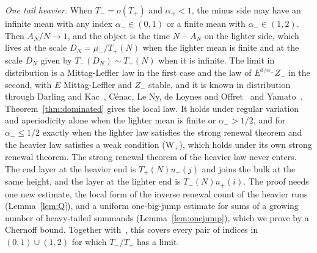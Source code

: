 \emph{One tail heavier.} When $T_\minus=o(T_\plus)$ and $\alpha_\plus<1$, the minus side may have
an infinite mean with any index $\alpha_\minus\in(0,1)$ or a finite mean with
$\alpha_\minus\in(1,2)$. Then $A_N/N\to1$, and the object is the time $N-A_N$ on the lighter
side, which lives at the scale $D_N=\mu_\minus/T_\plus(N)$ when the lighter mean is finite and at
the scale $D_N$ given by $T_\minus(D_N)\sim T_\plus(N)$ when it is infinite. The limit in
distribution is a Mittag-Leffler law in the first case and the law of $E^{1/\alpha_\minus}Z_\minus$
in the second, with $E$ Mittag-Leffler and $Z_\minus$ stable, and it is known in distribution
through Darling and Kac~\cite{darlingkac1957}, C\'enac, Le Ny, de Loynes and
Offret~\cite[Section~4.3]{clnlo2019} and Yamato~\cite{yamato2026}. Theorem~\ref{thm:dominated}
gives the local law. It holds under regular variation and aperiodicity alone when the lighter
mean is finite or $\alpha_\minus>1/2$, and for $\alpha_\minus\le1/2$ exactly when the lighter
law satisfies the strong renewal theorem and the heavier law satisfies a weak condition
(W$_\plus$), which holds under its own strong renewal theorem. The strong renewal theorem of the
heavier law never enters. The end layer at the heavier end is $T_\plus(N)u_\minus(j)$ and joins
the bulk at the same height, and the layer at the lighter end is $T_\minus(N)u_\plus(i)$. The
proof needs one new estimate, the local form of the inverse renewal count of the heavier runs
(Lemma~\ref{lem:Q}), and a uniform one-big-jump estimate for sums of a growing number of
heavy-tailed summands (Lemma~\ref{lem:onejump}), which we prove by a Chernoff bound. Together
with~\cite{paperF}, this covers every pair of indices in $(0,1)\cup(1,2)$ for which
$T_\minus/T_\plus$ has a limit.

